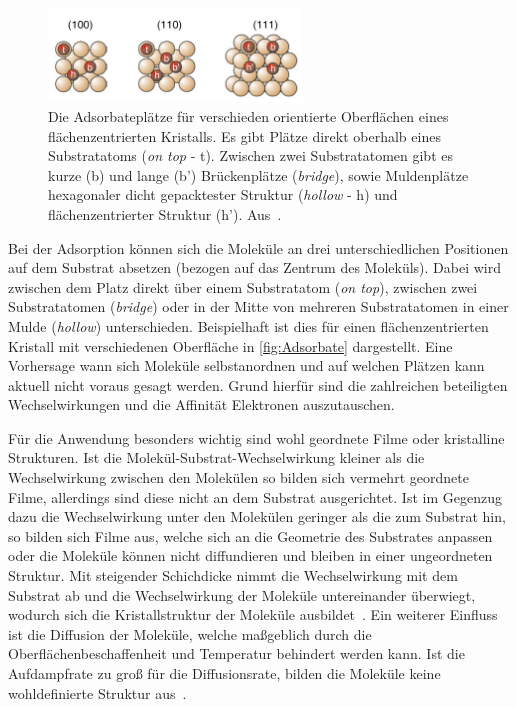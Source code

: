             \begin{figure}
                \centering
                \includegraphics[width=0.6\textwidth]{Adsorbate}
                \caption{Die Adsorbateplätze für verschieden orientierte Oberflächen eines flächenzentrierten Kristalls.
                Es gibt Plätze direkt oberhalb eines Substratatoms (\textit{on top} - t).
                Zwischen zwei Substratatomen gibt es kurze (b) und lange (b') Brückenplätze (\textit{bridge}), sowie Muldenplätze hexagonaler dicht gepacktester Struktur (\textit{hollow} - h) und flächenzentrierter Struktur (h'). Aus~\cite{Fauster}.}
                \label{fig:Adsorbate}
            \end{figure}
            Bei der Adsorption können sich die Moleküle an drei unterschiedlichen Positionen auf dem Substrat absetzen (bezogen auf das Zentrum des Moleküls).
            Dabei wird zwischen dem Platz direkt über einem Substratatom (\textit{on top}), zwischen zwei Substratatomen (\textit{bridge}) oder in der Mitte von mehreren Substratatomen in einer Mulde (\textit{hollow}) unterschieden.
            Beispielhaft ist dies für einen flächenzentrierten Kristall mit verschiedenen Oberfläche in \autoref{fig:Adsorbate} dargestellt.
            Eine Vorhersage wann sich Moleküle selbstanordnen und auf welchen Plätzen kann aktuell nicht voraus gesagt werden.
            Grund hierfür sind die zahlreichen beteiligten Wechselwirkungen und die Affinität Elektronen auszutauschen. 

            Für die Anwendung besonders wichtig sind wohl geordnete Filme oder kristalline Strukturen.
            Ist die Molekül-Substrat-Wechselwirkung kleiner als die Wechselwirkung zwischen den Molekülen so bilden sich vermehrt geordnete Filme, allerdings sind diese nicht an dem Substrat ausgerichtet.
            Ist im Gegenzug dazu die Wechselwirkung unter den Molekülen geringer als die zum Substrat hin, so bilden sich Filme aus, welche sich an die Geometrie des Substrates anpassen oder die Moleküle können nicht diffundieren und bleiben in einer ungeordneten Struktur.
            Mit steigender Schichdicke nimmt die Wechselwirkung mit dem Substrat ab und die Wechselwirkung der Moleküle untereinander überwiegt, wodurch sich die Kristallstruktur der Moleküle ausbildet~\cite{5A_9}.
            Ein weiterer Einfluss ist die Diffusion der Moleküle, welche maßgeblich durch die Oberflächenbeschaffenheit und Temperatur behindert werden kann.
            Ist die Aufdampfrate zu groß für die Diffusionsrate, bilden die Moleküle keine wohldefinierte Struktur aus~\cite{IF_15}.

